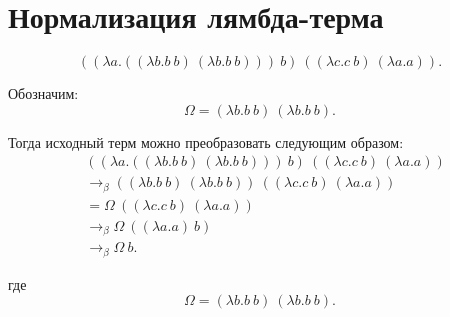 \documentclass[12pt]{article}
\begin{document}
\section*{Нормализация лямбда-терма}

\[
  ((\lambda a. ((\lambda b. b\ b)\ (\lambda b. b\ b)))\ b)
  \ ((\lambda c. c\ b)\ (\lambda a. a)).
\]

Обозначим:
\[
  \Omega = (\lambda b. b\ b)\ (\lambda b. b\ b).
\]

Тогда исходный терм можно преобразовать следующим образом:
\[
\begin{aligned}
&
((\lambda a. ((\lambda b. b\ b)\ (\lambda b. b\ b)))\ b)
\ ((\lambda c. c\ b)\ (\lambda a. a))
\\[8pt]
&\to_{\beta}
((\lambda b. b\ b)\ (\lambda b. b\ b))
\ ((\lambda c. c\ b)\ (\lambda a. a))
\\[8pt]
&=
\Omega\ ((\lambda c. c\ b)\ (\lambda a. a))
\\[8pt]
&\to_{\beta}
\Omega\ ((\lambda a. a)\ b)
\\[8pt]
&\to_{\beta}
\Omega\ b.
\end{aligned}
\]

где
\[
  \Omega = (\lambda b. b\ b)\ (\lambda b. b\ b).
\]
\end{document}
